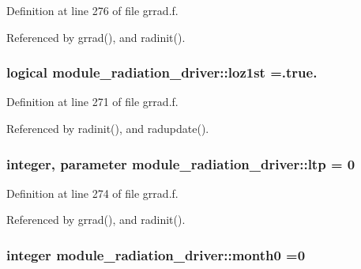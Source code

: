 Definition at line 276 of file grrad.\+f.



Referenced by grrad(), and radinit().

\subsubsection[{\texorpdfstring{loz1st}{loz1st}}]{\setlength{\rightskip}{0pt plus 5cm}logical module\+\_\+radiation\+\_\+driver\+::loz1st =.true.\hspace{0.3cm}{\ttfamily [private]}}\hypertarget{group__module__radiation__driver_gaf6e0e1ef2ebb78f57c897ebaf633edd2}{}\label{group__module__radiation__driver_gaf6e0e1ef2ebb78f57c897ebaf633edd2}


Definition at line 271 of file grrad.\+f.



Referenced by radinit(), and radupdate().

\subsubsection[{\texorpdfstring{ltp}{ltp}}]{\setlength{\rightskip}{0pt plus 5cm}integer, parameter module\+\_\+radiation\+\_\+driver\+::ltp = 0\hspace{0.3cm}{\ttfamily [private]}}\hypertarget{group__module__radiation__driver_gaab2535e9906afd709124056f4ca1e470}{}\label{group__module__radiation__driver_gaab2535e9906afd709124056f4ca1e470}


Definition at line 274 of file grrad.\+f.



Referenced by grrad(), and radinit().

\subsubsection[{\texorpdfstring{month0}{month0}}]{\setlength{\rightskip}{0pt plus 5cm}integer module\+\_\+radiation\+\_\+driver\+::month0 =0\hspace{0.3cm}{\ttfamily [private]}}\hypertarget{group__module__radiation__driver_ga6eb268f296c77047f389ed6fac5f95be}{}\label{group__module__radiation__driver_ga6eb268f296c77047f389ed6fac5f95be}


